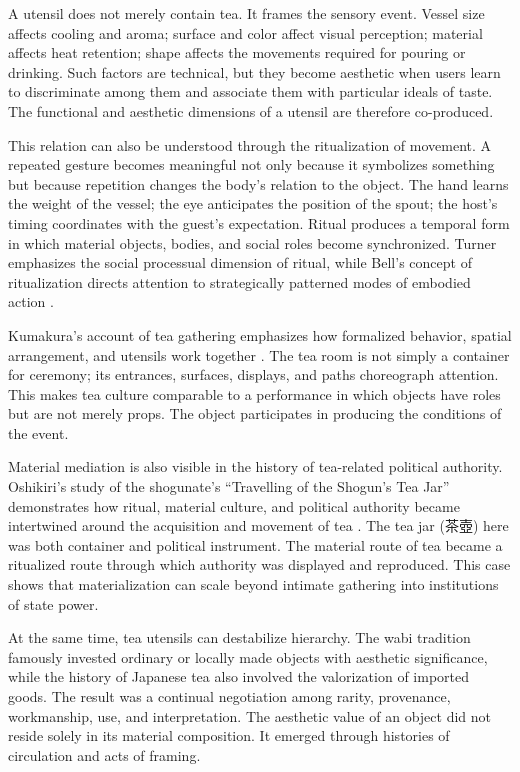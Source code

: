 \documentclass[numbers]{IntechOpen-Book}
\newcommand{\jp}[1]{{\CJKfontspec{Noto Serif CJK JP}\upshape #1}}
\begin{document}
A utensil does not merely contain tea. It frames the sensory event. Vessel size affects cooling and aroma; surface and color affect visual perception; material affects heat retention; shape affects the movements required for pouring or drinking. Such factors are technical, but they become aesthetic when users learn to discriminate among them and associate them with particular ideals of taste. The functional and aesthetic dimensions of a utensil are therefore co-produced.

This relation can also be understood through the ritualization of movement. A repeated gesture becomes meaningful not only because it symbolizes something but because repetition changes the body's relation to the object. The hand learns the weight of the vessel; the eye anticipates the position of the spout; the host's timing coordinates with the guest's expectation. Ritual produces a temporal form in which material objects, bodies, and social roles become synchronized. Turner emphasizes the social processual dimension of ritual, while Bell's concept of ritualization directs attention to strategically patterned modes of embodied action \cite{turner,bell}.

Kumakura's account of tea gathering emphasizes how formalized behavior, spatial arrangement, and utensils work together \cite{kumakura}. The tea room is not simply a container for ceremony; its entrances, surfaces, displays, and paths choreograph attention. This makes tea culture comparable to a performance in which objects have roles but are not merely props. The object participates in producing the conditions of the event.

Material mediation is also visible in the history of tea-related political authority. Oshikiri's study of the shogunate's ``Travelling of the Shogun's Tea Jar'' demonstrates how ritual, material culture, and political authority became intertwined around the acquisition and movement of tea \cite{oshikiri}. The tea jar (\jp{茶壺}) here was both container and political instrument. The material route of tea became a ritualized route through which authority was displayed and reproduced. This case shows that materialization can scale beyond intimate gathering into institutions of state power.

At the same time, tea utensils can destabilize hierarchy. The wabi tradition famously invested ordinary or locally made objects with aesthetic significance, while the history of Japanese tea also involved the valorization of imported goods. The result was a continual negotiation among rarity, provenance, workmanship, use, and interpretation. The aesthetic value of an object did not reside solely in its material composition. It emerged through histories of circulation and acts of framing.
\end{document}

